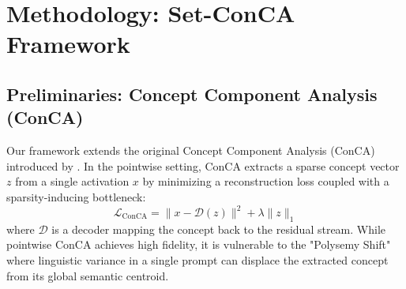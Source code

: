 \documentclass{article}
\begin{document}
\section{Methodology: Set-ConCA Framework}
\label{sec:methodology}

\subsection{Preliminaries: Concept Component Analysis (ConCA)}
Our framework extends the original Concept Component Analysis (ConCA) introduced by \citet{liu2026conca}. In the pointwise setting, ConCA extracts a sparse concept vector $z$ from a single activation $x$ by minimizing a reconstruction loss coupled with a sparsity-inducing bottleneck:
\begin{equation}
\mathcal{L}_{\text{ConCA}} = \|x - \mathcal{D}(z)\|^2 + \lambda \|z\|_1
\end{equation}
where $\mathcal{D}$ is a decoder mapping the concept back to the residual stream. While pointwise ConCA achieves high fidelity, it is vulnerable to the "Polysemy Shift" where linguistic variance in a single prompt can displace the extracted concept from its global semantic centroid.
\end{document}
